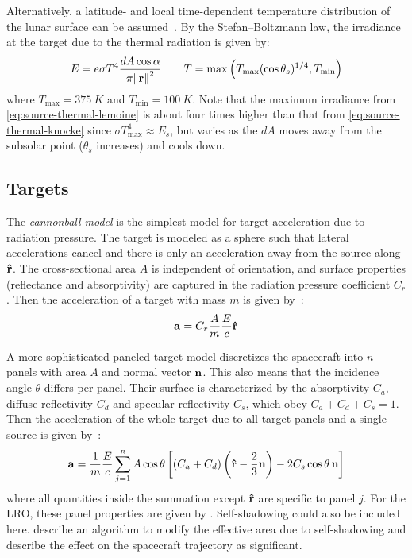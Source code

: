 \documentclass[parskip=full,DIV=15]{scrartcl}
\begin{document}
Alternatively, a latitude- and local time-dependent temperature distribution of the lunar surface can be assumed~\cite{Lemoine2013}. By the Stefan--Boltzmann law, the irradiance at the target due to the thermal radiation is given by:
\begin{align}\label{eq:source-thermal-lemoine}
   E = e\sigma T^4 \frac{dA\cos\alpha}{\pi \norm{\vb r}^2}
   \qquad
   T = \max\left(T_\text{max}(\cos\theta_s)^{1/4}, T_\text{min}\right)
\end{align}
where $T_\text{max}=\SI{375}{K}$ and $T_\text{min}=\SI{100}{K}$. Note that the maximum irradiance from \cref{eq:source-thermal-lemoine} is about four times higher than that from \cref{eq:source-thermal-knocke} since $\sigma T_\text{max}^4 \approx E_s$, but varies as the $dA$ moves away from the subsolar point ($\theta_s$ increases) and cools down.



\subsection{Targets}
The \emph{cannonball model} is the simplest model for target acceleration due to radiation pressure. The target is modeled as a sphere such that lateral accelerations cancel and there is only an acceleration away from the source along $\vu r$. The cross-sectional area $A$ is independent of orientation, and surface properties (reflectance and absorptivity) are captured in the radiation pressure coefficient $C_r$. Then the acceleration of a target with mass $m$ is given by~\cite{Knocke1988}:
\begin{align}
   \vb a = C_r \frac{A}{m} \frac{E}{c} \vu r
\end{align}

A more sophisticated paneled target model discretizes the spacecraft into $n$ panels with area $A$ and normal vector $\vb n$. This also means that the incidence angle $\theta$ differs per panel. Their surface is characterized by the absorptivity $C_a$, diffuse reflectivity $C_d$ and specular reflectivity $C_s$, which obey $C_a + C_d + C_s = 1$. Then the acceleration of the whole target due to all target panels and a single source is given by~\cite{Montenbruck2014}:
\begin{align}
   \vb a = \frac{1}{m} \frac{E}{c} \sum_{j=1}^n A \cos\theta \left[(C_a + C_d)\left(\vu r - \frac{2}{3} \vb n\right) - 2 C_s \cos\theta \, \vb n \right]
\end{align}
where all quantities inside the summation except $\vu r$ are specific to panel $j$. For the LRO, these panel properties are given by \textcite{Smith2008}. Self-shadowing could also be included here. \textcite{Mazarico2009} describe an algorithm to modify the effective area due to self-shadowing and describe the effect on the spacecraft trajectory as significant.
\end{document}
